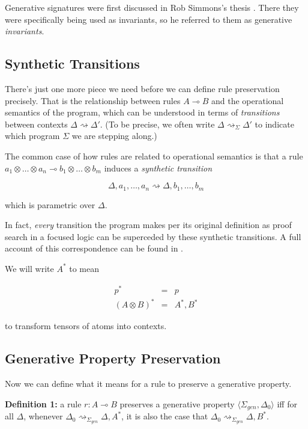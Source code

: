 \documentclass[fullpage, 11pt]{article}
\newcommand{\lolli}{\multimap}
\newcommand{\tensor}{\otimes}
\newcommand{\stepsto}{\rightsquigarrow}
\begin{document}
Generative signatures were first discussed in Rob Simmons's thesis
\cite{simmons12thesis}. There they were specifically being used as invariants, so he
referred to them as generative {\em invariants}.



\subsection{Synthetic Transitions}

There's just one more piece we need before we can define rule preservation
precisely. That is the relationship between rules $A \lolli B$ and the
operational semantics of the program, which can be understood in terms of
{\em transitions} between contexts $\Delta \stepsto \Delta'$. (To be
precise, we often write $\Delta \stepsto_{\Sigma} \Delta'$ to indicate
which program $\Sigma$ we are stepping along.) 

The common case of how rules are related to operational semantics is that a
rule $a_1 \tensor \dots \tensor a_n \lolli b_1 \tensor \dots \tensor b_m$
induces a {\em synthetic transition}

\[
\Delta, a_1, \dots, a_n \stepsto \Delta, b_1, \dots, b_m
\]

which is parametric over $\Delta$.

In fact, {\em every} transition the program makes per its original
definition as proof search in a focused logic can be superceded by these
synthetic transitions. A full account of this correspondence can be found
in \cite{deyoung12linear}.

We will write $A^*$ to mean

\begin{eqnarray*}
p^* &=& p \\
(A \tensor B)^* &=& A^*, B^*
\end{eqnarray*}

to transform tensors of atoms into contexts.

\subsection{Generative Property Preservation}

Now we can define what it means for a rule to preserve a generative
property.

{\bf Definition 1:} a rule $r : A \lolli B$ preserves a generative
property $\langle \Sigma_{gen}, \Delta_0 \rangle$ 
iff for all $\Delta$, whenever $\Delta_0 \stepsto_{\Sigma_{gen}} \Delta,
A^*$, it is also the case that $\Delta_0 \stepsto_{\Sigma_{gen}} \Delta,
B^*$.
\end{document}
